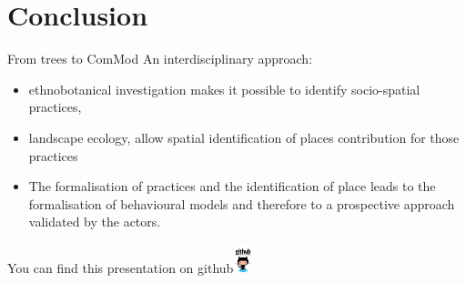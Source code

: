 \documentclass[newPxFont]{beamer}
\begin{document}
\section{Conclusion}
\begin{frame}[c]{From trees to ComMod}
\vspace{-1cm}
An interdisciplinary approach:
\begin{itemize}
  \item ethnobotanical  investigation makes it possible to identify socio-spatial practices,
  \item landscape ecology, allow spatial identification of places contribution for those practices
  \item The formalisation of practices and the identification of place leads to the formalisation of behavioural models and therefore to a prospective approach validated by the actors.
\end{itemize}
\end{frame}


{
%
\begin{frame}
  \vspace{-1em}
  \begin{minipage}[t][.8\textheight]{\textwidth}

    \vfill

  \end{minipage}
  \vspace{-3.5em}
  \centering
	You can find this presentation on github\includegraphics[height=0.85cm]{img/github}

\end{frame}
}
\end{document}
